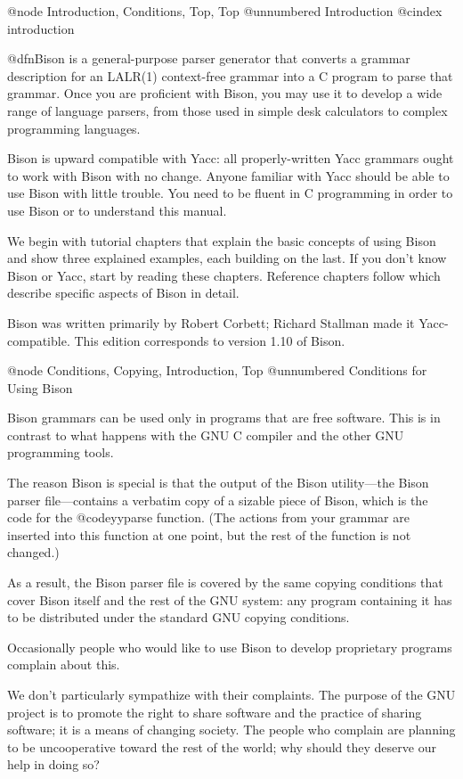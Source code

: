 @node Introduction, Conditions, Top, Top
@unnumbered Introduction
@cindex introduction

@dfn{Bison} is a general-purpose parser generator that converts a
grammar description for an LALR(1) context-free grammar into a C
program to parse that grammar.  Once you are proficient with Bison,
you may use it to develop a wide range of language parsers, from those
used in simple desk calculators to complex programming languages.

Bison is upward compatible with Yacc: all properly-written Yacc grammars
ought to work with Bison with no change.  Anyone familiar with Yacc
should be able to use Bison with little trouble.  You need to be fluent in
C programming in order to use Bison or to understand this manual.

We begin with tutorial chapters that explain the basic concepts of using
Bison and show three explained examples, each building on the last.  If you
don't know Bison or Yacc, start by reading these chapters.  Reference
chapters follow which describe specific aspects of Bison in detail.

Bison was written primarily by Robert Corbett; Richard Stallman made
it Yacc-compatible.  This edition corresponds to version 1.10 of Bison.

@node Conditions, Copying, Introduction, Top
@unnumbered Conditions for Using Bison

Bison grammars can be used only in programs that are free software.  This
is in contrast to what happens with the GNU C compiler and the other
GNU programming tools.

The reason Bison is special is that the output of the Bison utility---the
Bison parser file---contains a verbatim copy of a sizable piece of Bison,
which is the code for the @code{yyparse} function.  (The actions from your
grammar are inserted into this function at one point, but the rest of the
function is not changed.)

As a result, the Bison parser file is covered by the same copying
conditions that cover Bison itself and the rest of the GNU system: any
program containing it has to be distributed under the standard GNU copying
conditions.

Occasionally people who would like to use Bison to develop proprietary
programs complain about this.

We don't particularly sympathize with their complaints.  The purpose of the
GNU project is to promote the right to share software and the practice of
sharing software; it is a means of changing society.  The people who
complain are planning to be uncooperative toward the rest of the world; why
should they deserve our help in doing so?

